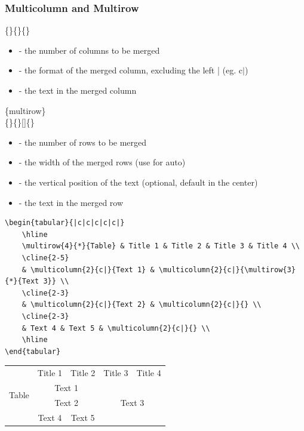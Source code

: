 \begin{frame}
	\frametitle{Multicolumn and Multirow}
	\begin{command}
		\{\}\{\}\{\}\\
		\begin{itemize}
			\item {} - the number of columns to be merged
			\item {} - the format of the merged column, excluding the left | (eg. c$|$)
			\item {} - the text in the merged column
		\end{itemize}
		\{multirow\}\\
		\{\}\{\}[]\{\}\\
		\begin{itemize}
			\item {} - the number of rows to be merged
			\item {} - the width of the merged rows (use \structure{*} for auto)
			\item {} - the vertical position of the text (optional, default in the center)
			\item {} - the text in the merged row
		\end{itemize}
	\end{command}
\end{frame}

\begin{frame}[fragile]
	\begin{example}
		\begin{verbatim}
\begin{tabular}{|c|c|c|c|c|}
    \hline
    \multirow{4}{*}{Table} & Title 1 & Title 2 & Title 3 & Title 4 \\
    \cline{2-5}
    & \multicolumn{2}{c|}{Text 1} & \multicolumn{2}{c|}{\multirow{3}{*}{Text 3}} \\
    \cline{2-3}
    & \multicolumn{2}{c|}{Text 2} & \multicolumn{2}{c|}{} \\
    \cline{2-3}
    & Text 4 & Text 5 & \multicolumn{2}{c|}{} \\
    \hline
\end{tabular}
		\end{verbatim}
	\end{example}
	\begin{tabular}{|c|c|c|c|c|}
		\hline
		\multirow{4}{*}{Table} & Title 1 & Title 2 & Title 3 & Title 4 \\
		\cline{2-5}
		& \multicolumn{2}{c|}{Text 1} & \multicolumn{2}{c|}{\multirow{3}{*}{Text 3}} \\
		\cline{2-3}
		& \multicolumn{2}{c|}{Text 2} & \multicolumn{2}{c|}{} \\
		\cline{2-3}
		& Text 4 & Text 5 & \multicolumn{2}{c|}{} \\
		\hline
	\end{tabular}
\end{frame}

